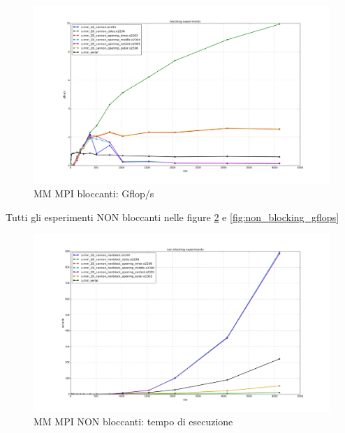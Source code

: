 \begin{figure}[htbp]
    \begin{center}
        \includegraphics[width=15cm]{immagini/blocking_gflops.png}
    \end{center}
    \caption{MM MPI bloccanti: Gflop/s}
    \label{fig:blocking_gflops}
\end{figure}

Tutti gli esperimenti NON bloccanti nelle figure \ref{fig:non_blocking_times} e \ref{fig:non_blocking_gflops}

\begin{figure}[htbp]
    \begin{center}
        \includegraphics[width=15cm]{immagini/non_blocking_times.png}
    \end{center}
    \caption{MM MPI NON bloccanti: tempo di esecuzione}
    \label{fig:non_blocking_times}
\end{figure}


